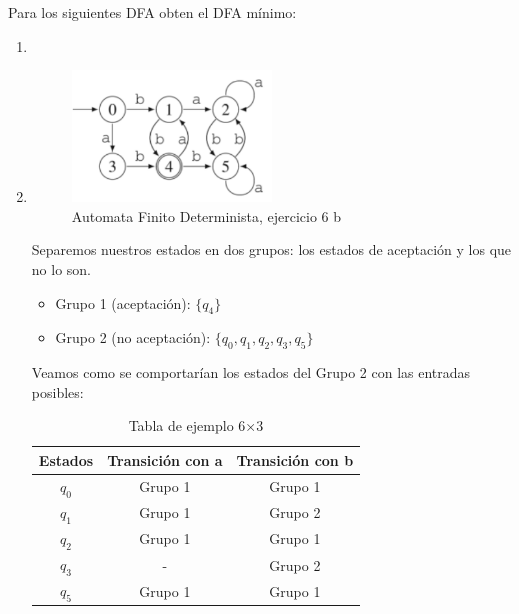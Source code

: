 \newpage
\begin{Pro}
   Para los siguientes DFA obten el DFA mínimo:
\end{Pro}

\begin{enumerate}
    \item 
    \item 
    \begin{figure}[h]
        \centering
        \includegraphics[width=0.5\textwidth]{images/ejercicio6b.png}
        \caption{Automata Finito Determinista, ejercicio 6 b}
    \end{figure}
    Separemos nuestros estados en dos grupos: los estados de aceptación y los que no lo son.
    \begin{itemize}
        \item Grupo 1 (aceptación): $\{q_4\}$
        \item Grupo 2 (no aceptación): $\{q_0, q_1, q_2, q_3, q_5\}$
    \end{itemize}

    Veamos como se comportarían los estados del Grupo 2 con las entradas posibles:
    \begin{table}[H]
    \centering
    \begin{tabular}{|c|c|c|}
    \hline
    \textbf{Estados} & \textbf{Transición con a} & \textbf{Transición con b } \\
    \hline
    $q_0$ & Grupo 1 & Grupo 1\\
    \hline
    $q_1$ & Grupo 1 & Grupo 2 \\
    \hline
    $q_2$  & Grupo 1 & Grupo 1 \\
    \hline
    $q_3$ & - & Grupo 2 \\
    \hline
    $q_5$ & Grupo 1 & Grupo 1 \\
    \hline
    \end{tabular}
    \caption{Tabla de ejemplo 6×3}
    \label{tab:ejemplo}
    \end{table}

\end{enumerate}

